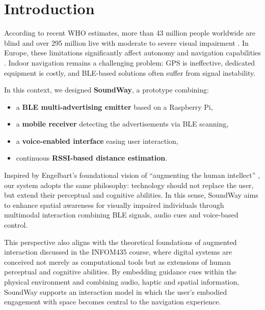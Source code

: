 \documentclass[sigconf]{acmart}
\begin{document}
\maketitle

\section{Introduction}

According to recent WHO estimates, more than 43 million people worldwide are blind and over 295 million live with moderate to severe visual impairment \cite{VisionImpairmentBlindness}. In Europe, these limitations significantly affect autonomy and navigation capabilities \cite{DontInventInvent}.  
Indoor navigation remains a challenging problem: GPS is ineffective, dedicated equipment is costly, and BLE-based solutions often suffer from signal instability.

In this context, we designed \textbf{SoundWay}, a prototype combining:
\begin{itemize}
    \item a \textbf{BLE multi-advertising emitter} based on a Raspberry Pi,
    \item a \textbf{mobile receiver} detecting the advertisements via BLE scanning,
    \item a \textbf{voice-enabled interface} easing user interaction,
    \item continuous \textbf{RSSI-based distance estimation}.
\end{itemize}

Inspired by Engelbart’s foundational vision of “augmenting the human intellect” \cite{Engelbart1962}, 
our system adopts the same philosophy: technology should not replace the user, but extend their 
perceptual and cognitive abilities. In this sense, SoundWay aims to enhance spatial awareness for 
visually impaired individuals through multimodal interaction combining BLE signals, audio cues and 
voice-based control.

This perspective also aligns with the theoretical foundations of augmented interaction 
discussed in the INFOM435 course, where digital systems are conceived not merely as 
computational tools but as extensions of human perceptual and cognitive abilities. 
By embedding guidance cues within the physical environment and combining audio, haptic 
and spatial information, SoundWay supports an interaction model in which the user’s 
embodied engagement with space becomes central to the navigation experience.
\end{document}
